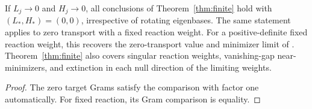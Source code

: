 \begin{corollary}\label{cor:zero}
If $L_j\to0$ and $H_j\to0$, all conclusions of
Theorem~\ref{thm:finite} hold with $(L_*,H_*)=(0,0)$, irrespective of
rotating eigenbases. The same statement applies to zero transport with a
fixed reaction weight. For a positive-definite fixed reaction weight, this
recovers the zero-transport value and minimizer limit of
\cite[Proposition 4.6]{LiZou}. Theorem~\ref{thm:finite} also covers singular
reaction weights, vanishing-gap near-minimizers, and extinction in each
null direction of the limiting weights.
\end{corollary}
\begin{proof}
The zero target Grams satisfy the comparison with factor one automatically.
For fixed reaction, its Gram comparison is equality.
\end{proof}

